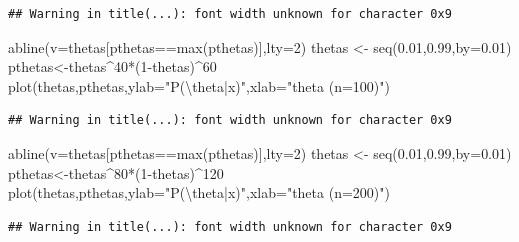 \documentclass[
]{book}
\newenvironment{Shaded}{\begin{snugshade}}{\end{snugshade}}
\newcommand{\AttributeTok}[1]{\textcolor[rgb]{0.77,0.63,0.00}{#1}}
\newcommand{\DecValTok}[1]{\textcolor[rgb]{0.00,0.00,0.81}{#1}}
\newcommand{\FloatTok}[1]{\textcolor[rgb]{0.00,0.00,0.81}{#1}}
\newcommand{\FunctionTok}[1]{\textcolor[rgb]{0.00,0.00,0.00}{#1}}
\newcommand{\NormalTok}[1]{#1}
\newcommand{\OtherTok}[1]{\textcolor[rgb]{0.56,0.35,0.01}{#1}}
\newcommand{\SpecialCharTok}[1]{\textcolor[rgb]{0.00,0.00,0.00}{#1}}
\newcommand{\StringTok}[1]{\textcolor[rgb]{0.31,0.60,0.02}{#1}}
\begin{document}
\begin{verbatim}
## Warning in title(...): font width unknown for character 0x9
\end{verbatim}

\begin{Shaded}
\begin{Highlighting}[]
\FunctionTok{abline}\NormalTok{(}\AttributeTok{v=}\NormalTok{thetas[pthetas}\SpecialCharTok{==}\FunctionTok{max}\NormalTok{(pthetas)],}\AttributeTok{lty=}\DecValTok{2}\NormalTok{)}
\NormalTok{thetas }\OtherTok{\textless{}{-}} \FunctionTok{seq}\NormalTok{(}\FloatTok{0.01}\NormalTok{,}\FloatTok{0.99}\NormalTok{,}\AttributeTok{by=}\FloatTok{0.01}\NormalTok{)}
\NormalTok{pthetas}\OtherTok{\textless{}{-}}\NormalTok{thetas}\SpecialCharTok{\^{}}\DecValTok{40}\SpecialCharTok{*}\NormalTok{(}\DecValTok{1}\SpecialCharTok{{-}}\NormalTok{thetas)}\SpecialCharTok{\^{}}\DecValTok{60}
\FunctionTok{plot}\NormalTok{(thetas,pthetas,}\AttributeTok{ylab=}\StringTok{"P(}\SpecialCharTok{\textbackslash{}t}\StringTok{heta|x)"}\NormalTok{,}\AttributeTok{xlab=}\StringTok{"theta  (n=100)"}\NormalTok{)}
\end{Highlighting}
\end{Shaded}

\begin{verbatim}
## Warning in title(...): font width unknown for character 0x9
\end{verbatim}

\begin{Shaded}
\begin{Highlighting}[]
\FunctionTok{abline}\NormalTok{(}\AttributeTok{v=}\NormalTok{thetas[pthetas}\SpecialCharTok{==}\FunctionTok{max}\NormalTok{(pthetas)],}\AttributeTok{lty=}\DecValTok{2}\NormalTok{)}
\NormalTok{thetas }\OtherTok{\textless{}{-}} \FunctionTok{seq}\NormalTok{(}\FloatTok{0.01}\NormalTok{,}\FloatTok{0.99}\NormalTok{,}\AttributeTok{by=}\FloatTok{0.01}\NormalTok{)}
\NormalTok{pthetas}\OtherTok{\textless{}{-}}\NormalTok{thetas}\SpecialCharTok{\^{}}\DecValTok{80}\SpecialCharTok{*}\NormalTok{(}\DecValTok{1}\SpecialCharTok{{-}}\NormalTok{thetas)}\SpecialCharTok{\^{}}\DecValTok{120}
\FunctionTok{plot}\NormalTok{(thetas,pthetas,}\AttributeTok{ylab=}\StringTok{"P(}\SpecialCharTok{\textbackslash{}t}\StringTok{heta|x)"}\NormalTok{,}\AttributeTok{xlab=}\StringTok{"theta  (n=200)"}\NormalTok{)}
\end{Highlighting}
\end{Shaded}

\begin{verbatim}
## Warning in title(...): font width unknown for character 0x9
\end{verbatim}
\end{document}
